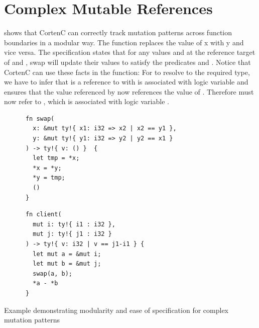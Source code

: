 \documentclass[twoside, english]{sdqthesis}
\theoremstyle{definition}
\begin{document}
\label{subsec:evaluation-complex-mutable-ref}\section{Complex Mutable References}

 shows that CortenC can correctly track mutation patterns across function boundaries in a modular way. 
The  function replaces the value of x with y and vice versa. The specification states that for any values  and  at the reference target of  and , swap will update their values to satisfy the predicates  and .
Notice that CortenC can use these facts in the  function: For  to resolve to the required type, we have to infer that  is a reference to  with is associated with logic variable  and  ensures that the value referenced by  now references the value of . Therefore  must now refer to , which is associated with logic variable .

\begin{listing}[h]
  \begin{minipage}[t]{0.52\linewidth}
    \begin{verbatim}
      fn swap(
        x: &mut ty!{ x1: i32 => x2 | x2 == y1 },
        y: &mut ty!{ y1: i32 => y2 | y2 == x1 }
      ) -> ty!{ v: () }  {
        let tmp = *x;
        *x = *y;
        *y = tmp;
        ()
      }
    \end{verbatim}
  \end{minipage}
  \begin{minipage}[t]{0.5\linewidth}
    \begin{verbatim}
      fn client(
        mut i: ty!{ i1 : i32 },
        mut j: ty!{ j1 : i32 }
      ) -> ty!{ v: i32 | v == j1-i1 } {
        let mut a = &mut i;
        let mut b = &mut j;
        swap(a, b);
        *a - *b
      }
    \end{verbatim}
  \end{minipage}

  \caption{Example demonstrating modularity and ease of specification for complex mutation patterns}
  \label{lst:evaluation-swap}
\end{listing}
\end{document}
